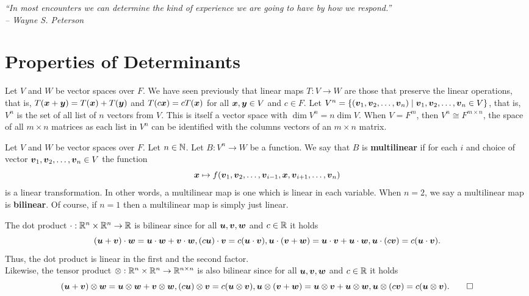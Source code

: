 \begin{center} 
\emph{``In most encounters we can determine the kind of experience we are going to have by how we respond.''\\ -- Wayne S. Peterson}
\end{center}

\section{Properties of Determinants}\label{sec:deterprop}
Let $V$ and $W$ be vector spaces over $F$. We have seen previously that linear maps $T : V \to W$ are those that preserve the linear operations, that is, $T(\boldsymbol x+\boldsymbol y) = T(\boldsymbol x)+T(\boldsymbol y)$ and $T(c\boldsymbol x) = cT(\boldsymbol x)$ for all $\boldsymbol x,\boldsymbol y\in V$ and $c\in F$. Let $V^n = \{(\boldsymbol v_1, \boldsymbol v_2,\ldots, \boldsymbol v_n)\mid \boldsymbol v_1, \boldsymbol v_2,\ldots, \boldsymbol v_n\in V\}$, that is, $V^n$ is the set of all list of $n$ vectors from $V$. This is itself a vector space with $\dim V^n = n\dim V$. When $V=F^m$, then $V^n \cong F^{m\times n}$, the space of all $m\times n$ matrices as each list in $V^n$ can be identified with the columns vectors of an $m\times n$ matrix. \\

\begin{Def} Let $V$ and $W$ be vector spaces over $F$. Let $n\in \mathbb{N}$. Let $B : V^n \to W$ be a function. We say that $B$ is \textbf{multilinear} if for each $i$ and choice of vector $\boldsymbol v_1, \boldsymbol v_2, \ldots, \boldsymbol v_n\in V$ the function 
\[\boldsymbol x \mapsto f(\boldsymbol v_1, \boldsymbol v_2, \ldots, \boldsymbol v_{i-1}, \boldsymbol x, \boldsymbol v_{i+1},\ldots, \boldsymbol v_n)\] is a linear transformation. In other words, a multilinear map is one which is linear in each variable. When $n=2$, we say a multilinear map is \textbf{bilinear}. Of course, if $n=1$ then a multilinear map is simply just linear.
\end{Def}\vs

\begin{Exam} The dot product $\cdot : \mathbb{R}^n\times \mathbb{R}^n \to \mathbb{R}$ is bilinear since for all $\boldsymbol u, \boldsymbol v, \boldsymbol w$ and $c\in \mathbb{R}$ it holds
\[(\boldsymbol u+\boldsymbol v)\cdot \boldsymbol w = \boldsymbol u\cdot \boldsymbol w + \boldsymbol v\cdot \boldsymbol w, (c\boldsymbol u)\cdot \boldsymbol v = c(\boldsymbol u\cdot \boldsymbol v), \boldsymbol u\cdot (\boldsymbol v+\boldsymbol w) = \boldsymbol u\cdot \boldsymbol v + \boldsymbol u\cdot \boldsymbol w, \boldsymbol u \cdot(c\boldsymbol v) = c(\boldsymbol u \cdot \boldsymbol v).\] Thus, the dot product is linear in the first and the second factor. \\

Likewise, the tensor product $\otimes : \mathbb{R}^n\times \mathbb{R}^n \to \mathbb{R}^{n\times n}$ is also bilinear since  for all $\boldsymbol u, \boldsymbol v, \boldsymbol w$ and $c\in \mathbb{R}$ it holds
\[(\boldsymbol u+\boldsymbol v)\otimes \boldsymbol w = \boldsymbol u\otimes \boldsymbol w + \boldsymbol v\otimes \boldsymbol w, (c\boldsymbol u)\otimes \boldsymbol v = c(\boldsymbol u\otimes \boldsymbol v), \boldsymbol u\otimes (\boldsymbol v+\boldsymbol w) = \boldsymbol u\otimes \boldsymbol v + \boldsymbol u\otimes \boldsymbol w, \boldsymbol u \otimes(c\boldsymbol v) = c(\boldsymbol u \otimes \boldsymbol v). \qedhere\]
\end{Exam}\vs

